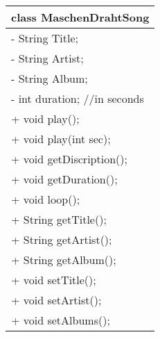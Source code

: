 \documentclass{scrartcl}
\begin{document}
\begin{tabular}{|p{}|}
\hline
	class MaschenDrahtSong\\
\hline
	- String Title;\\
	- String Artist;\\
	- String Album;\\
	- int duration; //in seconds\\
\hline
	+ void play();\\
	+ void play(int sec);\\
	+ void getDiscription();\\
	+ void getDuration();\\
	+ void loop();\\
	+ String getTitle();\\
	+ String getArtist();\\
	+ String getAlbum();\\
	+ void setTitle();\\
	+ void setArtist();\\
	+ void setAlbums();\\
\hline
\end{tabular}
\end{document}
